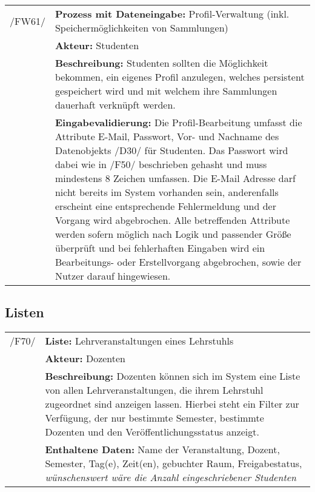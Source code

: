 \begin{tabular}{p{1.5cm}p{14.5cm}}
					
	 /FW61/& \textbf{Prozess mit Dateneingabe:} Profil-Verwaltung (inkl. Speichermöglichkeiten von Sammlungen) \\
				& \textbf{Akteur:} Studenten \\
				& \textbf{Beschreibung:} Studenten sollten die Möglichkeit bekommen, ein eigenes Profil anzulegen, welches persistent gespeichert wird und mit welchem ihre Sammlungen dauerhaft verknüpft werden. \\
				& \textbf{Eingabevalidierung:} Die Profil-Bearbeitung umfasst die Attribute E-Mail, Passwort, Vor- und Nachname des Datenobjekts /D30/ für Studenten. Das Passwort wird dabei wie in /F50/ beschrieben gehasht und muss mindestens 8 Zeichen umfassen. Die E-Mail Adresse darf nicht bereits im System vorhanden sein, anderenfalls erscheint eine entsprechende Fehlermeldung und der Vorgang wird abgebrochen. Alle betreffenden Attribute werden sofern möglich nach Logik und passender Größe überprüft und bei fehlerhaften Eingaben wird ein Bearbeitungs- oder Erstellvorgang abgebrochen, sowie der Nutzer darauf hingewiesen.\\[0.25cm]

\end{tabular}


\subsection{Listen}


\begin{tabular}{p{1.5cm}p{14.5cm}}


	 /F70/	& \textbf{Liste:} Lehrveranstaltungen eines Lehrstuhls \\
				& \textbf{Akteur:} Dozenten \\
				& \textbf{Beschreibung:} Dozenten können sich im System eine Liste von allen Lehrveranstaltungen, die ihrem Lehrstuhl zugeordnet sind anzeigen lassen. Hierbei steht ein Filter zur Verfügung, der nur bestimmte Semester, bestimmte Dozenten und den Veröffentlichungsstatus anzeigt. \\
				& \textbf{Enthaltene Daten:} Name der Veranstaltung, Dozent, Semester, Tag(e), Zeit(en), gebuchter Raum, Freigabestatus, \textsl{wünschenswert wäre die Anzahl eingeschriebener Studenten} \\[0.25cm]

\end{tabular}

